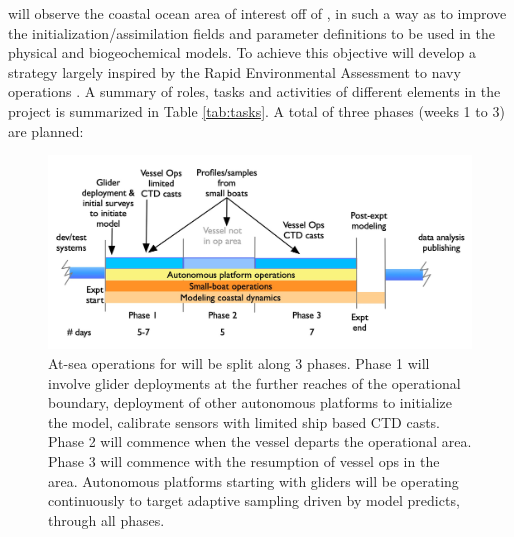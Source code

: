 \proj will observe the coastal ocean area of interest off of \naze, in
such a way as to improve the initialization/assimilation fields and
parameter definitions to be used in the physical and biogeochemical
models. To achieve this objective \proj will develop a strategy largely
inspired by the Rapid Environmental Assessment to navy operations
. A summary of roles, tasks and activities of different
elements in the project is summarized in Table \ref{tab:tasks}. A total
of three phases (weeks 1 to 3) are planned:

\begin{figure}[!t]
  \vspace{-0.5cm}
  \centering
  \includegraphics[scale=0.25]{fig/timelines.jpg}
  \caption{At-sea operations for \proj will be split along 3 phases.
    Phase 1 will involve glider deployments at the further reaches of
    the operational boundary, deployment of other autonomous platforms
    to initialize the model, calibrate sensors with limited ship based
    CTD casts. Phase 2 will commence when the vessel departs the \naz
    operational area. Phase 3 will commence with the resumption of
    vessel ops in the \naz area. Autonomous platforms starting with
    gliders will be operating continuously to target adaptive sampling
    driven by model predicts, through all phases.}
  \vspace{-0.3cm}
 \label{fig:expt-phases}
\end{figure}

 
